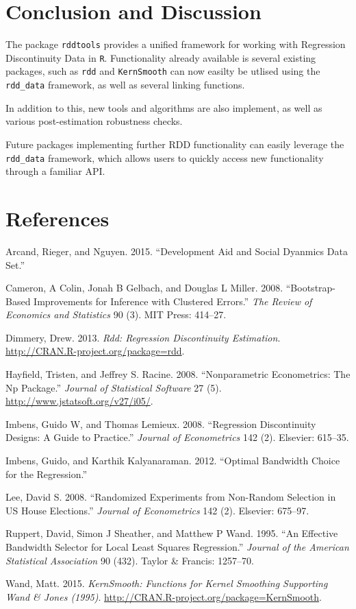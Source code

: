 \documentclass[article]{jss}
\begin{document}
\section{Conclusion and Discussion}\label{conclusion-and-discussion}

The package \texttt{rddtools} provides a unified framework for working
with Regression Discontinuity Data in \texttt{R}. Functionality already
available is several existing packages, such as \texttt{rdd} and
\texttt{KernSmooth} can now easilty be utlised using the
\texttt{rdd\_data} framework, as well as several linking functions.

In addition to this, new tools and algorithms are also implement, as
well as various post-estimation robustness checks.

Future packages implementing further RDD functionality can easily
leverage the \texttt{rdd\_data} framework, which allows users to quickly
access new functionality through a familiar API.

\section*{References}\label{references}

Arcand, Rieger, and Nguyen. 2015. ``Development Aid and Social Dyanmics
Data Set.''

Cameron, A Colin, Jonah B Gelbach, and Douglas L Miller. 2008.
``Bootstrap-Based Improvements for Inference with Clustered Errors.''
\emph{The Review of Economics and Statistics} 90 (3). MIT Press:
414--27.

Dimmery, Drew. 2013. \emph{Rdd: Regression Discontinuity Estimation}.
\url{http://CRAN.R-project.org/package=rdd}.

Hayfield, Tristen, and Jeffrey S. Racine. 2008. ``Nonparametric
Econometrics: The Np Package.'' \emph{Journal of Statistical Software}
27 (5). \url{http://www.jstatsoft.org/v27/i05/}.

Imbens, Guido W, and Thomas Lemieux. 2008. ``Regression Discontinuity
Designs: A Guide to Practice.'' \emph{Journal of Econometrics} 142 (2).
Elsevier: 615--35.

Imbens, Guido, and Karthik Kalyanaraman. 2012. ``Optimal Bandwidth
Choice for the Regression.''

Lee, David S. 2008. ``Randomized Experiments from Non-Random Selection
in US House Elections.'' \emph{Journal of Econometrics} 142 (2).
Elsevier: 675--97.

Ruppert, David, Simon J Sheather, and Matthew P Wand. 1995. ``An
Effective Bandwidth Selector for Local Least Squares Regression.''
\emph{Journal of the American Statistical Association} 90 (432). Taylor
\& Francis: 1257--70.

Wand, Matt. 2015. \emph{KernSmooth: Functions for Kernel Smoothing
Supporting Wand \& Jones (1995)}.
\url{http://CRAN.R-project.org/package=KernSmooth}.
\end{document}
